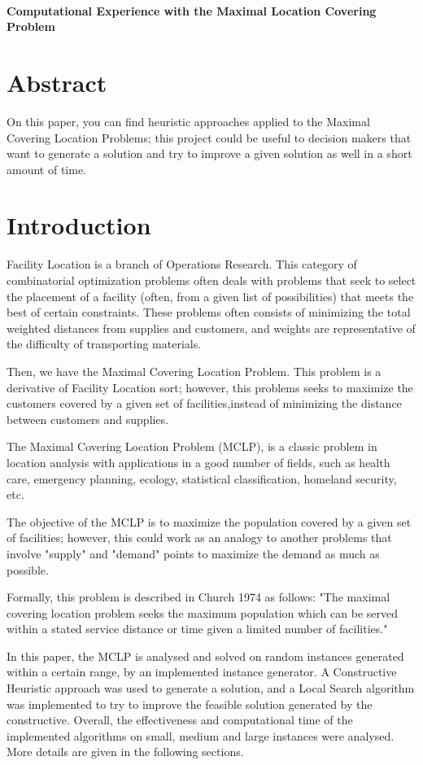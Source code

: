 \documentclass[11pt, a4paper]{article}
\newcommand{\Title}[1]{{\LARGE \centering \hrulefill\\ \textbf{#1}\\ \hrulefill}}
\begin{document}
\pagestyle{plain}


\onehalfspacing
\setcounter{page}{1}
\Title{Computational Experience with the Maximal Location Covering Problem}

\section*{Abstract}
{\small \singlespacing
	On this paper, you can find heuristic approaches applied to the Maximal Covering Location Problems; this project could be useful to decision makers that want to generate a solution and try to improve a given solution as well in a short amount of time.  
}

\section{Introduction}\label{sec:intro}
Facility Location is a branch of Operations Research. This category of combinatorial optimization problems often deals with problems that seek to select the placement of a facility (often, from a given list of possibilities) that meets the best of certain constraints. These problems often consists of minimizing the total weighted distances from supplies and customers, and weights are representative of the difficulty of transporting materials. 

Then, we have the Maximal Covering Location Problem. This problem is a derivative of Facility Location sort; however, this problems seeks to maximize the customers covered by a given set of facilities,instead of minimizing the distance between customers and supplies. 

The Maximal Covering Location Problem (MCLP), is a classic problem in location analysis with    applications in a good number of fields, such as health care, emergency planning, ecology, statistical classification, homeland security, etc.

The objective of the MCLP is to maximize the population covered by a given set of facilities; however, this could work as an analogy to another problems that involve "supply" and "demand" points to maximize the demand as much as possible.

Formally, this problem is described in Church 1974 as follows:
"The maximal covering location problem seeks the maximum population which can be served within a stated service distance or time given a limited number of facilities."

In this paper, the MCLP is analysed and solved on random instances generated within a certain range, by an implemented instance generator. A Constructive Heuristic approach was used to generate a solution, and a Local Search algorithm was implemented to try to improve the feasible solution generated by the constructive. Overall, the effectiveness and computational time of the implemented algorithms on small, medium and large instances were analysed. More details are given in the following sections. 
\end{document}

